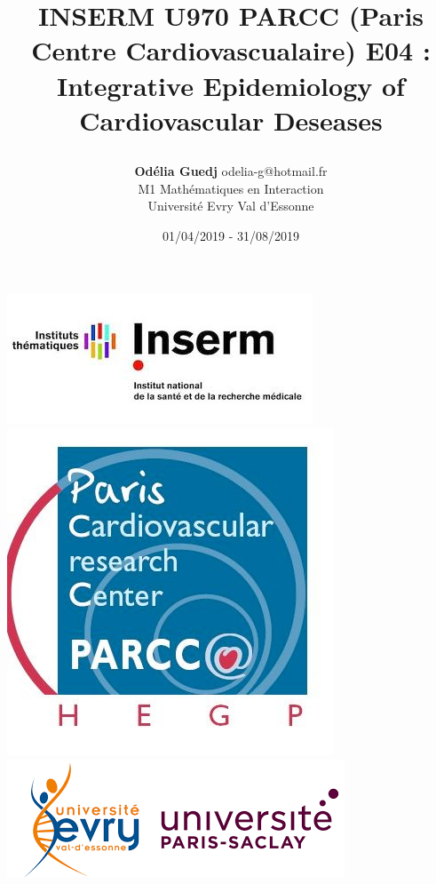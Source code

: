 \documentclass{book}
\title{%
\begin{minipage}\linewidth
        \centering\bfseries\sffamily
        \Large{INSERM U970 PARCC (Paris Centre Cardiovascualaire)}
        \vskip3pt 
        E04 : Integrative Epidemiology of Cardiovascular Deseases
    \end{minipage}}
\author{\textbf{Odélia Guedj} odelia-g@hotmail.fr \\ M1 Mathématiques en Interaction \\ Université Evry Val d'Essonne}
\date{01/04/2019 - 31/08/2019}
\begin{document}
\begin{titlepage}

\enlargethispage{10 cm}

\includegraphics[scale = .4]{logo_inserm.jpg}\hfill
\includegraphics[scale = .2]{logo_parcc.jpg}\hfill
\includegraphics[scale = .4]{logo_ueve_saclay.png}
\\ \\ \\ \\ \\ \\ \\ \\ \\ \\


\end{titlepage}
\end{document}
